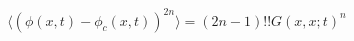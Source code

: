 \begin{equation}
\langle (\phi(x,t)- \phi_c(x,t)) ^{2n} \rangle = (2n-1)!!  G(x,x;t)^{n}
\end{equation}

